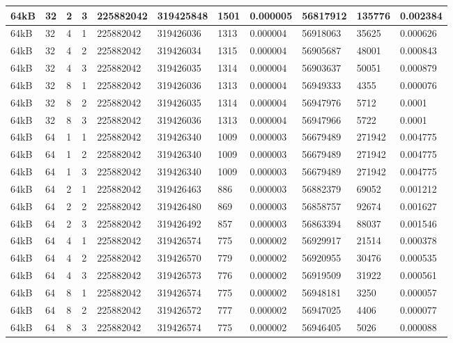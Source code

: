 \documentclass[conference]{IEEEtran}
\begin{document}
\begin{table}
\begin{tabular}{|m{.75cm} |m{.75cm} |m{.8cm} | m{.75cm} | l | l | l | l | l | l | l |}
64kB&	32&	2&	3&	225882042&	319425848&	1501  &	0.000005  &	56817912  &	135776	&0.002384 \\ \hline
64kB&	32&	4&	1&	225882042&	319426036&	1313  &	0.000004  &	56918063  &	35625	  &0.000626 \\ \hline
64kB&	32&	4&	2&	225882042&	319426034&	1315  &	0.000004  &	56905687  &	48001	  &0.000843 \\ \hline
64kB&	32&	4&	3&	225882042&	319426035&	1314  &	0.000004  &	56903637  &	50051	  &0.000879 \\ \hline
64kB&	32&	8&	1&	225882042&	319426036&	1313  &	0.000004  &	56949333  &	4355	  &0.000076 \\ \hline
64kB&	32&	8&	2&	225882042&	319426035&	1314  &	0.000004  &	56947976  &	5712	  &0.0001 \\ \hline
64kB&	32&	8&	3&	225882042&	319426036&	1313  &	0.000004  &	56947966  &	5722	  &0.0001 \\ \hline
64kB&	64&	1&	1&	225882042&	319426340&	1009  &	0.000003  &	56679489  &	271942	&0.004775 \\ \hline
64kB&	64&	1&	2&	225882042&	319426340&	1009  &	0.000003  &	56679489  &	271942	&0.004775 \\ \hline
64kB&	64&	1&	3&	225882042&	319426340&	1009  &	0.000003  &	56679489  &	271942	&0.004775 \\ \hline
64kB&	64&	2&	1&	225882042&	319426463&	886	  &0.000003	  &56882379	  &69052	  &0.001212 \\ \hline
64kB&	64&	2&	2&	225882042&	319426480&	869	  &0.000003	  &56858757	  &92674	  &0.001627 \\ \hline
64kB&	64&	2&	3&	225882042&	319426492&	857	  &0.000003	  &56863394	  &88037	  &0.001546 \\ \hline
64kB&	64&	4&	1&	225882042&	319426574&	775	  &0.000002	  &56929917	  &21514	  &0.000378 \\ \hline
64kB&	64&	4&	2&	225882042&	319426570&	779	  &0.000002	  &56920955	  &30476	  &0.000535 \\ \hline
64kB&	64&	4&	3&	225882042&	319426573&	776	  &0.000002	  &56919509	  &31922	  &0.000561 \\ \hline
64kB&	64&	8&	1&	225882042&	319426574&	775	  &0.000002	  &56948181	  &3250	    &0.000057 \\ \hline
64kB&	64&	8&	2&	225882042&	319426572&	777	  &0.000002	  &56947025	  &4406	    &0.000077 \\ \hline
64kB&	64&	8&	3&	225882042&	319426574&	775	  &0.000002	  &56946405	  &5026	    &0.000088 \\ \hline
    \end{tabular}
  \end{table}
\end{document}
